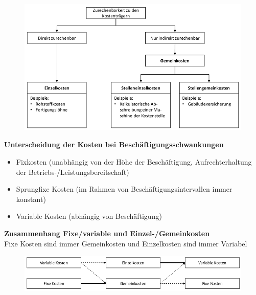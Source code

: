 \documentclass[a4paper,11pt, twoside]{article}
\newcommand\mpar[1]{\marginpar {\flushleft\small #1}}
\begin{document}
\begin{figure}[h]
 \begin{center}
   \includegraphics[scale=0.3]{bilder/primaerkosten.png}
 \end{center}
\end{figure}

\textbf{Unterscheidung der Kosten bei Beschäftigungsschwankungen}
\mpar{\textcolor{red}{Fixkosten bleiben immer Fixkosten}}
\begin{itemize}
	\item Fixkosten (unabhängig von der Höhe der Beschäftigung, Aufrechterhaltung der Betriebs-/Leistungsbereitschaft)
	\item Sprungfixe Kosten (im Rahmen von Beschäftigungsintervallen immer konstant)
	\item Variable Kosten (abhängig von Beschäftigung)
\end{itemize}

\textbf{Zusammenhang Fixe/variable und Einzel-/Gemeinkosten}\\
Fixe Kosten sind immer Gemeinkosten und Einzelkosten sind immer Variabel
\begin{figure}[h]
 \begin{center}
   \includegraphics[scale=0.3]{bilder/zshkosten.png}
 \end{center}
\end{figure}
\newpage 
\end{document}
